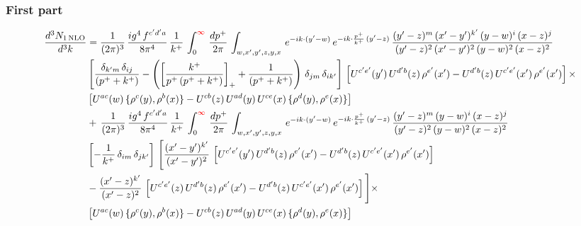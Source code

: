 \documentclass[9pt]{article}
\numberwithin{equation}{section}
\newcommand{\chg}[1]{{\color{red}#1}}
\begin{document}
\subsubsection{First part}
\begin{align}
     \frac{d^{3}N_{1\,\rm NLO}}{d^{3}k} & =  \frac{1}{(2\pi)^{3}}\, \frac{ig^{4}\,f^{c'd'a}}{8\pi^{4}}\, \frac{1}{k^{+}}\,\int_{0}^{\chg{\infty}}\,  \frac{dp^{+}}{2\pi}\, \int_{w,x',y',z,y,x}\, e^{-ik\cdot (y'-w)}\, e^{-ik\cdot \frac{p^{+}}{k^{+}}\,(y'-z)}\,\frac{(y'-z)^{m}\,(x'-y')^{k'}\,(y-w)^{i}\,(x-z)^{j}}{(y'-z)^{2}\,(x'-y')^{2}\,(y-w)^{2}\,(x-z)^{2}}\notag \\ & \left[\frac{\delta_{k'm}\,\delta_{ij}}{(p^{+}+k^{+})}-\left(\left[\frac{k^{+}}{p^{+}\,(p^{+}+k^{+})}\right]_{+}+\frac{1}{(p^{+}+k^{+})}\right)\,\delta_{jm}\,\delta_{ik'}\right]\, \left[U^{c'e'}(y')\,U^{d'b}(z)\,\rho^{e'}(x')-U^{d'b}(z)\,U^{c'e'}(x')\,\rho^{e'}(x')\right]\times\notag \\ &  \left[U^{ac}(w)\, \{\rho^{c}(y),\rho^{b}(x)\}-U^{cb}(z)\,U^{ad}(y)\,U^{ce}(x)\,\{\rho^{d}(y),\rho^{e}(x)\}\right] \notag \\
&  +\,\frac{1}{(2\pi)^{3}}\, \frac{ig^{4}\,f^{c'd'a}}{8\pi^{4}}\, \frac{1}{k^{+}}\,\int_{0}^{\chg{\infty}}\,  \frac{dp^{+}}{2\pi}\, \int_{w,x',y',z,y,x}\, e^{-ik\cdot (y'-w)}\, e^{-ik\cdot \frac{p^{+}}{k^{+}}\,(y'-z)}\,\frac{(y'-z)^{m}\,(y-w)^{i}\,(x-z)^{j}}{(y'-z)^{2}\,(y-w)^{2}\,(x-z)^{2}}\notag \\ &   \left[-\frac{1}{k^{+}}\, \delta_{im}\, \delta_{jk'}\right]\, \Bigg[\frac{(x'-y')^{k'}}{(x'-y')^{2}}\,\left[U^{c'e'}(y')\,U^{d'b}(z)\,\rho^{e'}(x')-U^{d'b}(z)\,U^{c'e'}(x')\,\rho^{e'}(x')\right]\notag \\ & -\frac{(x'-z)^{k'}}{(x'-z)^{2}}\,\left[U^{c'e'}(z)\,U^{d'b}(z)\,\rho^{e'}(x')-U^{d'b}(z)\,U^{c'e'}(x')\,\rho^{e'}(x')\right]\Bigg]\times\notag \\ &   \left[U^{ac}(w)\, \{\rho^{c}(y),\rho^{b}(x)\}-U^{cb}(z)\,U^{ad}(y)\,U^{ce}(x)\,\{\rho^{d}(y),\rho^{e}(x)\}\right]
\end{align}
\end{document}
